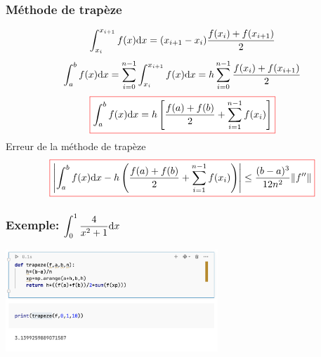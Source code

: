 \documentclass{beamer}
\def \de {{\rm d}}
\newcommand{\myredbox}[1]{\fcolorbox{red}{white}{$\displaystyle#1$}}
\begin{document}
\begin{frame}
 \frametitle{Méthode de trapèze}
%  
%    

 \[\int_{x_i}^{x_{i+1}}f(x)\de x=(x_{i+1}-x_i) \frac{f(x_i)+f(x_{i+1})}{2}\] 
\[\int_a^bf(x)\de x= \sum_{i=0}^{n-1}\int_{x_i}^{x_{i+1}}f(x)\de x=
h \sum_{i=0}^{n-1}\frac{f(x_i)+f(x_{i+1})}{2}\] 
 \[\myredbox{\int_a^bf(x)\de x= h \left[\frac{f(a)+f(b)}{2}  + \sum_{i=1}^{n-1} f(x_i)\right]}\] 
 Erreur de la méthode de trapèze
 \[ \myredbox{\left| \int_a^bf(x)\de x -h \left(\frac{f(a)+f(b)}{2}  + \sum_{i=1}^{n-1} f(x_i)\right)\right| \leq   \frac{(b-a)^3}{12n^2}\|f''\|} \]
\end{frame}
\begin{frame}
 \frametitle{Exemple: $\displaystyle \int_0^1\frac{4}{x^2+1}\de x$}
 \includegraphics[width=8cm]{images/methodeDeTrapeze00.png}
 

\end{frame}
\end{document}
